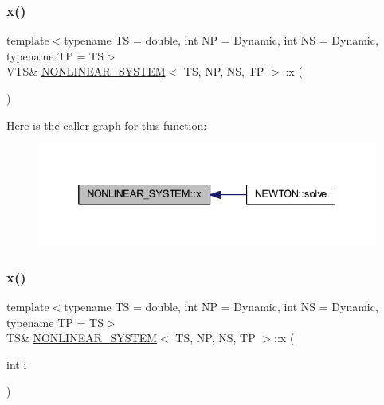\mbox{\label{class_n_o_n_l_i_n_e_a_r___s_y_s_t_e_m_a74d8eaa53624eae38a6f2e6b5bdd4381}} 
\subsubsection{\texorpdfstring{x()}{x()}\hspace{0.1cm}{\footnotesize\ttfamily [1/2]}}
{\footnotesize\ttfamily template$<$typename TS = double, int NP = Dynamic, int NS = Dynamic, typename TP = TS$>$ \\
V\+TS\& \mbox{\hyperlink{class_n_o_n_l_i_n_e_a_r___s_y_s_t_e_m}{N\+O\+N\+L\+I\+N\+E\+A\+R\+\_\+\+S\+Y\+S\+T\+EM}}$<$ TS, NP, NS, TP $>$\+::x (\begin{DoxyParamCaption}{ }\end{DoxyParamCaption})\hspace{0.3cm}{\ttfamily [inline]}}

Here is the caller graph for this function\+:\nopagebreak
\begin{figure}[H]
\begin{center}
\leavevmode
\includegraphics[width=332pt]{class_n_o_n_l_i_n_e_a_r___s_y_s_t_e_m_a74d8eaa53624eae38a6f2e6b5bdd4381_icgraph}
\end{center}
\end{figure}
\mbox{\label{class_n_o_n_l_i_n_e_a_r___s_y_s_t_e_m_aabd6041ce7d6aaad8ce55e03c2efde1e}} 
\subsubsection{\texorpdfstring{x()}{x()}\hspace{0.1cm}{\footnotesize\ttfamily [2/2]}}
{\footnotesize\ttfamily template$<$typename TS = double, int NP = Dynamic, int NS = Dynamic, typename TP = TS$>$ \\
TS\& \mbox{\hyperlink{class_n_o_n_l_i_n_e_a_r___s_y_s_t_e_m}{N\+O\+N\+L\+I\+N\+E\+A\+R\+\_\+\+S\+Y\+S\+T\+EM}}$<$ TS, NP, NS, TP $>$\+::x (\begin{DoxyParamCaption}\item[{int}]{i }\end{DoxyParamCaption})\hspace{0.3cm}{\ttfamily [inline]}}



